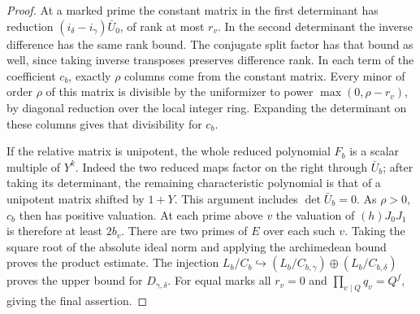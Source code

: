 \documentclass[a4paper,11pt]{article}
\theoremstyle{definition}
\theoremstyle{remark}
\numberwithin{equation}{section}
\begin{document}
\begin{proof}
At a marked prime the constant matrix in the first determinant
has reduction \((i_\delta-i_\gamma)\bar U_0\), of rank at most
\(r_v\). In the second determinant the inverse difference has
the same rank bound. The conjugate split factor has that bound
as well, since taking inverse transposes preserves difference
rank. In each term of the coefficient \(c_b\), exactly \(\rho\)
columns come from the constant matrix. Every minor of order
\(\rho\) of this matrix is divisible by the uniformizer to
power \(\max(0,\rho-r_v)\), by diagonal reduction over the
local integer ring. Expanding the determinant on these columns
gives that divisibility for \(c_b\).

If the relative matrix is unipotent, the whole reduced
polynomial \(F_b\) is a scalar multiple of \(Y^k\). Indeed the
two reduced maps factor on the right through \(\bar U_b\);
after taking its determinant, the remaining characteristic
polynomial is that of a unipotent matrix shifted by \(1+Y\).
This argument includes \(\det\bar U_b=0\). As \(\rho>0\),
\(c_b\) then has positive valuation. At each prime above \(v\)
the valuation of \((h)J_0J_1\) is therefore at least \(2b_v\).
There are two primes of \(E\) over each such \(v\). Taking the
square root of the absolute ideal norm and applying the
archimedean bound proves the product estimate. The injection
\(L_b/C_b\hookrightarrow (L_b/C_{b,\gamma})\oplus
(L_b/C_{b,\delta})\) proves the upper bound for
\(D_{\gamma,\delta}\). For equal marks all \(r_v=0\) and
\(\prod_{v\mid Q}q_v=Q^f\), giving the final assertion.
\end{proof}
\end{document}
